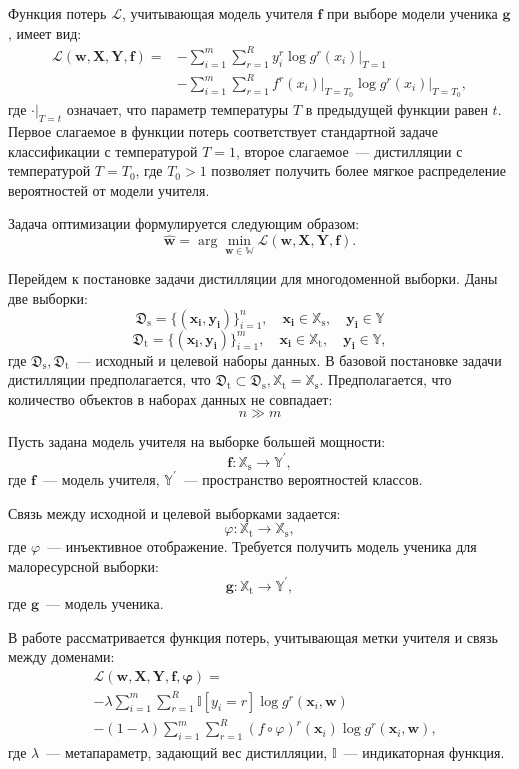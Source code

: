 Функция потерь $\mathcal{L}$, учитывающая модель учителя $\mathbf{f}$ при выборе модели ученика $\mathbf{g}$, имеет вид:
\[
\begin{aligned}
     \mathcal{L}(\mathbf{w,X,Y,f})=&-\sum\limits_{i=1}^{m}\sum\limits_{r=1}^{R}y_{i }^{r}\log{g^{r}(x_{i})}\bigr|_{T=1}\\
     &-\sum\limits_{i=1}^{m}\sum\limits_{r=1}^{R}f^{r}(x_{i})\bigr|_{T=T_{0} }\log{g^{r}(x_{i})}\bigr|_{T=T_{0}},
\end{aligned}
\]
где $\cdot\bigr|_{T=t}$ означает, что параметр температуры $T$ в предыдущей функции равен $t$. Первое слагаемое в функции потерь соответствует стандартной задаче классификации с температурой $T=1$, второе слагаемое~--- дистилляции с температурой $T=T_0$, где $T_0 > 1$ позволяет получить более мягкое распределение вероятностей от модели учителя.

Задача оптимизации формулируется следующим образом:
$$\hat{\mathbf{w}} = \arg\min_{\mathbf{w} \in \mathbb{W}} \mathcal{L}(\mathbf{w,X,Y,f}).$$

Перейдем к постановке задачи дистилляции для многодоменной выборки. Даны две выборки:
$$\mathfrak{D}_{\text{s}}=\{(\mathbf{x_i},\mathbf{y_i})\}_{i=1}^n,
\quad \mathbf{x_i} \in \mathbb{X}_{\text{s}},
\quad \mathbf{y_i} \in \mathbb{Y}$$
$$\mathfrak{D}_{\text{t}}=\{(\mathbf{x_i},\mathbf{y_i})\}_{i=1}^m, \quad \mathbf {x_i} \in \mathbb{X}_{\text{t}},
\quad \mathbf{y_i} \in \mathbb{Y},$$
где $\mathfrak{D}_{\text{s}}, \mathfrak{D}_{\text{t}}$~--- исходный и целевой наборы данных. В базовой постановке задачи дистилляции предполагается, что
$\mathfrak{D}_{\text{t}} \subset \mathfrak{D}_{\text{s}},
\mathbb{X}_{\text{t}}=\mathbb{X}_{\text{s}}$. Предполагается, что количество объектов в наборах данных не совпадает:
$$n \gg m$$

Пусть задана модель учителя на выборке большей мощности:
$$\mathbf{f}: \mathbb{X}_{\text{s}} \rightarrow \mathbb{Y}^{\prime},$$
где $\mathbf{f}$~--- модель учителя, $\mathbb{Y}^{\prime}$~--- пространство вероятностей классов.

Связь между исходной и целевой выборками задается:
$$\varphi: \mathbb{X}_{\text{t}} \rightarrow \mathbb{X}_{\text{s}},$$
где $\varphi$~--- инъективное отображение. Требуется получить модель ученика для малоресурсной выборки:
$$\mathbf{g}: \mathbb{X}_{\text{t}} \rightarrow \mathbb{Y}^{\prime},$$
где $\mathbf{g}$~--- модель ученика.

В работе рассматривается функция потерь, учитывающая метки учителя и связь между доменами:
\begin{align}
    &\mathcal{L}(\mathbf{w,X,Y,f,\varphi})=\\&
    -\lambda\sum\limits_{i=1}^{m}\sum\limits_{r=1}^{ R}\mathbb{I}[y_{i}=r]\log{g^{r}(\mathbf{x}_{i},\mathbf{w})} \\&-(1-\lambda)\sum\limits_{i=1}^{m}\sum\limits_{r=1}^{R}(f\circ \varphi)^{r}(\mathbf{x }_{i})\log{g^{r}(\mathbf{x}_{i},\mathbf{w})},
\end{align}
где $\lambda$~--- метапараметр, задающий вес дистилляции, $\mathbb{I}$~--- индикаторная функция.

